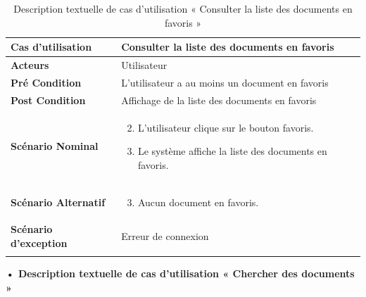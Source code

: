 \begin{longtable}{|p{5cm}|p{10cm}|}
\hline
\textbf{Cas d'utilisation}&Consulter la liste des documents en favoris\\
\hline
\textbf{Acteurs}&Utilisateur\\
\hline
\textbf{Pré Condition}&L'utilisateur a au moins un document en favoris\\
\hline
\textbf{Post Condition}&Affichage de la liste des documents en favoris\\
\hline
\textbf{Scénario Nominal}&
\vspace{-\baselineskip}
\begin{enumerate}
    \setcounter{enumi}{1}
    \item L'utilisateur clique sur le bouton favoris.
    \item Le système affiche la liste des documents en favoris.
\end{enumerate}\\
\hline
\textbf{Scénario Alternatif}&
\vspace{-\baselineskip}
\begin{enumerate}
    \setcounter{enumi}{2}
    \item Aucun document en favoris.
\end{enumerate}\\
\hline
\textbf{Scénario d'exception}&Erreur de connexion\\
\hline
\caption{Description textuelle de cas d'utilisation « Consulter la liste des documents en favoris  »}
\label{tab:DescriptionTextuelleDeCasDUtilisationConsulterLaListeDesDocumentsEnFavoris}
\end{longtable}




\textbf{•	Description textuelle de cas d'utilisation « Chercher des documents »}

